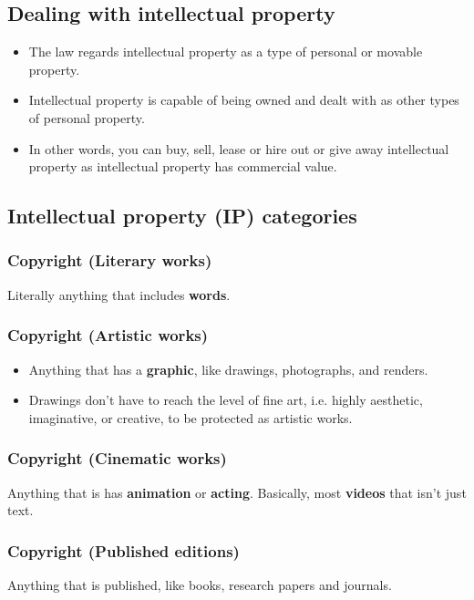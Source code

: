 \documentclass[11pt]{article}
\begin{document}
\subsection{Dealing with intellectual property}
\label{sec:org446e47b}
\begin{itemize}
\item The law regards intellectual property as a type of personal or movable property.
\item Intellectual property is capable of being owned and dealt with as other types of personal property.
\item In other words, you can buy, sell, lease or hire out or give away intellectual property as intellectual property has commercial value.
\end{itemize}

 \newpage

\subsection{Intellectual property (IP) categories}
\label{sec:orgf518509}

\subsubsection{Copyright (Literary works)}
\label{sec:orgcced97a}
Literally anything that includes \textbf{words}.

\subsubsection{Copyright (Artistic works)}
\label{sec:orgb271a57}
\begin{itemize}
\item Anything that has a \textbf{graphic}, like drawings, photographs, and renders.
\item Drawings don't have to reach the level of fine art, i.e. highly aesthetic, imaginative, or creative, to be protected as artistic works.
\end{itemize}

\subsubsection{Copyright (Cinematic works)}
\label{sec:orgdde4f78}
Anything that is has \textbf{animation} or \textbf{acting}. Basically, most \textbf{videos} that isn't just text.

\subsubsection{Copyright (Published editions)}
\label{sec:org3032ff2}
Anything that is published, like books, research papers and journals.
\end{document}

